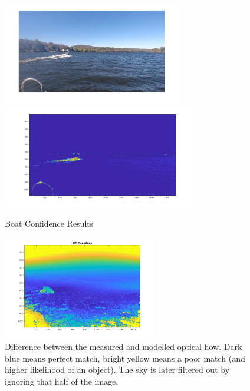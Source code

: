 \documentclass{article}
\begin{document}
\begin{figure}[H]
\includegraphics[width=7.8cm]{hsv_kmeans2_orig}
\includegraphics[width=8.5cm]{hsv_kmeans2_suppressed}
\centering
\caption{Boat Confidence Results}
\label{fig:boatconf}
\end{figure}

\begin{figure}
\centering
\includegraphics[width=0.6\textwidth]{diff_magnitude}
\caption{Difference between the measured and modelled optical flow.
         Dark blue means perfect match, bright yellow means a poor match (and
         higher likelihood of an object).
         The sky is later filtered out by ignoring that half of the image.}
\label{fig:diff_magnitude}
\end{figure}
\end{document}
